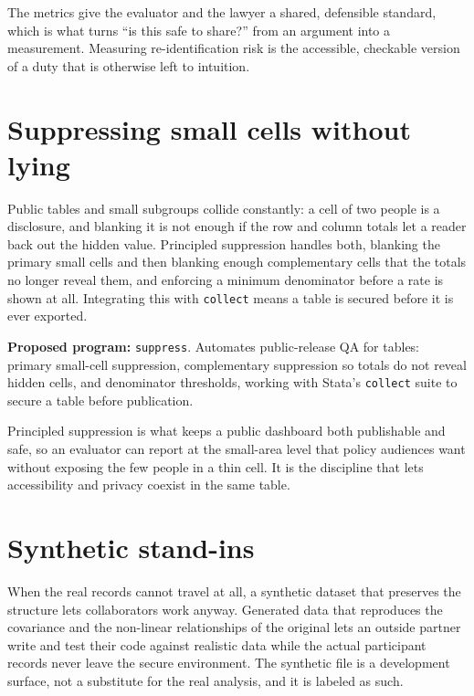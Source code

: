 \documentclass[
    a4paper,
    fontsize=10pt,
    twoside=true,
    numbers=noenddot,
]{kaobook}
\begin{document}
The metrics give the evaluator and the lawyer a shared, defensible standard, which is what turns \enquote{is this safe to share?} from an argument into a measurement. Measuring re-identification risk is the accessible, checkable version of a duty that is otherwise left to intuition.

\section{Suppressing small cells without lying}
Public tables and small subgroups collide constantly: a cell of two people is a disclosure, and blanking it is not enough if the row and column totals let a reader back out the hidden value. Principled suppression handles both, blanking the primary small cells and then blanking enough complementary cells that the totals no longer reveal them, and enforcing a minimum denominator before a rate is shown at all. Integrating this with \texttt{collect} means a table is secured before it is ever exported.

\begin{kaobox}[frametitle=Ado-file Idea: \texttt{suppress}]
\textbf{Proposed program:} \texttt{suppress}. Automates public-release QA for tables: primary small-cell suppression, complementary suppression so totals do not reveal hidden cells, and denominator thresholds, working with Stata's \texttt{collect} suite to secure a table before publication.
\end{kaobox}

Principled suppression is what keeps a public dashboard both publishable and safe, so an evaluator can report at the small-area level that policy audiences want without exposing the few people in a thin cell. It is the discipline that lets accessibility and privacy coexist in the same table.

\section{Synthetic stand-ins}
When the real records cannot travel at all, a synthetic dataset that preserves the structure lets collaborators work anyway. Generated data that reproduces the covariance and the non-linear relationships of the original lets an outside partner write and test their code against realistic data while the actual participant records never leave the secure environment. The synthetic file is a development surface, not a substitute for the real analysis, and it is labeled as such.
\end{document}
